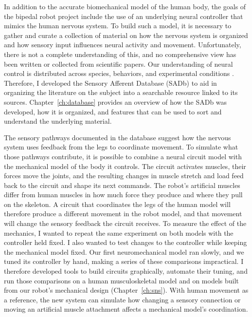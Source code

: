 In addition to the accurate biomechanical model of the human body, the goals of the bipedal robot project include the use of an underlying neural controller that mimics the human nervous system. To build such a model, it is necessary to gather and curate a collection of material on how the nervous system is organized and how sensory input influences neural activity and movement. Unfortunately, there is not a complete understanding of this, and no comprehensive view has been written or collected from scientific papers. Our understanding of neural control is distributed across species, behaviors, and experimental conditions \citep{van_de_crommert_review_1998, windhorst_muscle_2007, windhorst_spinal_2022}. Therefore, I developed the Sensory Afferent Database (SADb) to aid in organizing the literature on the subject into a searchable resource linked to its sources. Chapter~\ref{ch:database} provides an overview of how the SADb was developed, how it is organized, and features that can be used to sort and understand the underlying material.

The sensory pathways documented in the database suggest how the nervous system uses feedback from the legs to coordinate movement. To simulate what those pathways contribute, it is possible to combine a neural circuit model with the mechanical model of the body it controls. The circuit activates muscles, their forces move the joints, and the resulting changes in muscle stretch and load feed back to the circuit and shape its next commands. The robot’s artificial muscles differ from human muscles in how much force they produce and where they pull on the skeleton. A circuit that coordinates the legs of the human model will therefore produce a different movement in the robot model, and that movement will change the sensory feedback the circuit receives. To measure the effect of the mechanics, I wanted to repeat the same experiment on both models with the controller held fixed. I also wanted to test changes to the controller while keeping the mechanical model fixed. Our first neuromechanical model ran slowly, and we tuned its controller by hand, making a series of these comparisons impractical. I therefore developed tools to build circuits graphically, automate their tuning, and run those comparisons on a human musculoskeletal model and on models built from our robot's mechanical design (Chapter~\ref{ch:sns}). With human movement as a reference, the new system can simulate how changing a sensory connection or moving an artificial muscle attachment affects a mechanical model's coordination.

